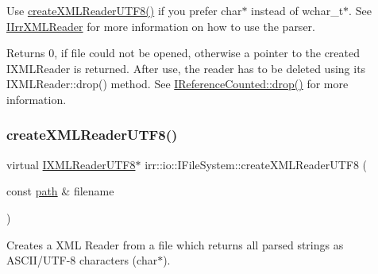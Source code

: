 Use \hyperlink{classirr_1_1io_1_1IFileSystem_affd8f622ac7c3dcd507f20f9cd23b21f}{create\+X\+M\+L\+Reader\+U\+T\+F8()} if you prefer char$\ast$ instead of wchar\+\_\+t$\ast$. See \hyperlink{classirr_1_1io_1_1IIrrXMLReader}{I\+Irr\+X\+M\+L\+Reader} for more information on how to use the parser. \begin{DoxyReturn}{Returns}
0, if file could not be opened, otherwise a pointer to the created I\+X\+M\+L\+Reader is returned. After use, the reader has to be deleted using its I\+X\+M\+L\+Reader\+::drop() method. See \hyperlink{classirr_1_1IReferenceCounted_a03856a09355b89d178090c4a5f738543}{I\+Reference\+Counted\+::drop()} for more information. 
\end{DoxyReturn}
\mbox{\label{classirr_1_1io_1_1IFileSystem_affd8f622ac7c3dcd507f20f9cd23b21f}} 
\subsubsection{\texorpdfstring{create\+X\+M\+L\+Reader\+U\+T\+F8()}{createXMLReaderUTF8()}\hspace{0.1cm}{\footnotesize\ttfamily [1/2]}}
{\footnotesize\ttfamily virtual \hyperlink{namespaceirr_1_1io_a2dedc8156931082e6b147b562195e310}{I\+X\+M\+L\+Reader\+U\+T\+F8}$\ast$ irr\+::io\+::\+I\+File\+System\+::create\+X\+M\+L\+Reader\+U\+T\+F8 (\begin{DoxyParamCaption}\item[{const \hyperlink{namespaceirr_1_1io_ab1bdc45edb3f94d8319c02bc0f840ee1}{path} \&}]{filename }\end{DoxyParamCaption})\hspace{0.3cm}{\ttfamily [pure virtual]}}



Creates a X\+ML Reader from a file which returns all parsed strings as A\+S\+C\+I\+I/\+U\+T\+F-\/8 characters (char$\ast$). 

